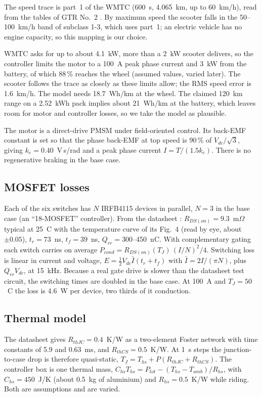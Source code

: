 \documentclass[conference]{IEEEtran}
\begin{document}
The speed trace is part~1 of the WMTC (600~s, 4.065~km, up to 60~km/h),
read from the tables of GTR No.~2 \cite{gtr2}. By maximum speed the scooter
falls in the 50--100~km/h band of subclass 1-3, which uses part~1; an
electric vehicle has no engine capacity, so this mapping is our choice.

WMTC asks for up to about 4.1~kW, more than a 2~kW scooter delivers, so the
controller limits the motor to a 100~A peak phase current and 3~kW from the
battery, of which 88\,\% reaches the wheel (assumed values, varied later). The scooter follows the trace as
closely as these limits allow; the RMS speed error is 1.6~km/h. The model
needs 18.7~Wh/km at the wheel. The claimed 120~km range on a 2.52~kWh pack
implies about 21~Wh/km at the battery, which leaves room for motor and
controller losses, so we take the model as plausible.

The motor is a direct-drive PMSM under field-oriented control. Its back-EMF
constant is set so that the phase back-EMF at top speed is 90\,\% of
$V_{dc}/\sqrt3$, giving $k_e=0.40$~V\,s/rad and a peak phase current
$I=T/(1.5k_e)$. There is no regenerative braking in the base case.

\subsection{MOSFET losses}
Each of the six switches has $N$ IRFB4115 devices in parallel, $N=3$ in the
base case (an ``18-MOSFET'' controller). From the datasheet \cite{infineonds}:
$R_{DS(on)}=9.3$~m$\Omega$ typical at 25~\textdegree C with the temperature
curve of its Fig.~4 (read by eye, about $\pm0.05$), $t_r=73$~ns, $t_f=39$~ns, $Q_{rr}=300$--450~nC. With
complementary gating each switch carries on average
$P_{cond}=R_{DS(on)}(T_J)\,(I/N)^2/4$. Switching loss is linear in current
and voltage, $E=\tfrac12 V_{dc}\bar I(t_r+t_f)$ with $\bar I=2I/(\pi N)$,
plus $Q_{rr}V_{dc}$, at 15~kHz. Because a real gate drive is slower than the
datasheet test circuit, the switching times are doubled in the base case.
At 100~A and $T_J=50$~\textdegree C the loss is 4.6~W per device, two
thirds of it conduction.

\subsection{Thermal model}
The datasheet gives $R_{thJC}=0.4$~K/W as a two-element Foster network with
time constants of 5.9 and 0.63~ms, and $R_{thCS}=0.5$~K/W. At 1~s steps the
junction-to-case drop is therefore quasi-static,
$T_J=T_{hs}+P(R_{thJC}+R_{thCS})$. The controller box is one thermal mass,
$C_{hs}\dot T_{hs}=P_{tot}-(T_{hs}-T_{amb})/R_{hs}$, with $C_{hs}=450$~J/K
(about 0.5~kg of aluminium) and $R_{hs}=0.5$~K/W while riding. Both are
assumptions and are varied.
\end{document}
